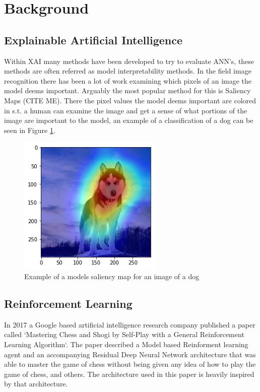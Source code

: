 \section{Background}

\subsection{Explainable Artificial Intelligence}

Within XAI many methods have been developed to try to evaluate
ANN's, these methods are often referred as model interpretability methods.
In the field image recognition there has been a lot of work examining which
pixels of an image the model deems important. Arguably the most popular
method for this is Saliency Maps (CITE ME). There the pixel values the model
deems important are colored in s.t. a human can examine the image and get a
sense of what portions of the image are important to the model, an example of
a classification of a dog can be seen in Figure \ref{fig:dog_saliency}.

\begin{figure}[]
  \centering
  \includegraphics[width=.5\textwidth]{graphics/dog_saliency}
  \caption{Example of a models saliency map for an image of a dog}
  \label{fig:dog_saliency}
\end{figure}



\subsection{Reinforcement Learning}

In 2017 a Google based artificial intelligence research company published a paper called
`Mastering Chess and Shogi by Self-Play with a General Reinforcement Learning Algorithm`.
The paper described a Model based Reinforment learning agent and an accompanying Residual
Deep Neural Network architecture that was able to master the game of chess without being
given any idea of how to play the game of chess, and others. The architecture used in this
paper is heavily inspired by that architecture.

